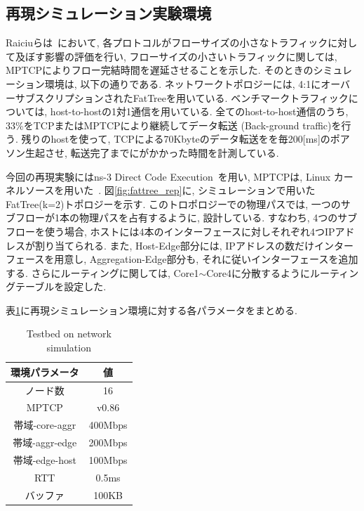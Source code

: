 \documentclass[10pt, a4paper, twocolumn]{jsarticle}
\begin{document}
\subsection{再現シミュレーション実験環境}
Raiciuらは~\cite{improving}において, 各プロトコルがフローサイズの小さなトラフィックに対して及ぼす影響の評価を行い,
フローサイズの小さいトラフィックに関しては, MPTCPによりフロー完結時間を遅延させることを示した.
そのときのシミュレーション環境は, 以下の通りである.
ネットワークトポロジーには, 4:1にオーバーサブスクリプションされたFatTreeを用いている.
ベンチマークトラフィックについては, host-to-hostの1対1通信を用いている.
全てのhost-to-host通信のうち, 33\%をTCPまたはMPTCPにより継続してデータ転送 (Back-ground traffic)を行う.
残りのhostを使って, TCPによる70Kbyteのデータ転送をを毎200[ms]のポアソン生起させ, 転送完了までにがかかった時間を計測している.

今回の再現実験にはns-3 Direct Code Execution~\cite{ns3}を用い, MPTCPは, Linux
カーネルソースを用いた~\cite{mptcp_linux}.
図\ref{fig:fattree_rep}に, シミュレーションで用いたFatTree(k=2)トポロジーを示す.
このトロポロジーでの物理パスでは, 一つのサブフローが1本の物理パスを占有するように, 設計している.
すなわち, 4つのサブフローを使う場合, ホストには4本のインターフェースに対しそれぞれ4つIPアドレスが割り当てられる.
また, Host-Edge部分には, IPアドレスの数だけインターフェースを用意し, Aggregation-Edge部分も,
それに従いインターフェースを追加する.
さらにルーティングに関しては, Core1$\sim$Core4に分散するようにルーティングテーブルを設定した.

表\ref{table:testbed}に再現シミュレーション環境に対する各パラメータをまとめる.
\begin{table}[h]
\begin{center}
\footnotesize
\begin{tabular}{c|c}
\hline
環境パラメータ & 値 \\ \hline \hline
ノード数 & 16 \\
MPTCP & v0.86 \\
帯域-core-aggr & 400Mbps \\
帯域-aggr-edge & 200Mbps \\
帯域-edge-host & 100Mbps \\
RTT & 0.5ms\\
バッファ & 100KB \\
\hline
\end{tabular}
\caption{Testbed on network simulation}
\label{table:testbed}
\end{center}
\end{table}
\end{document}

